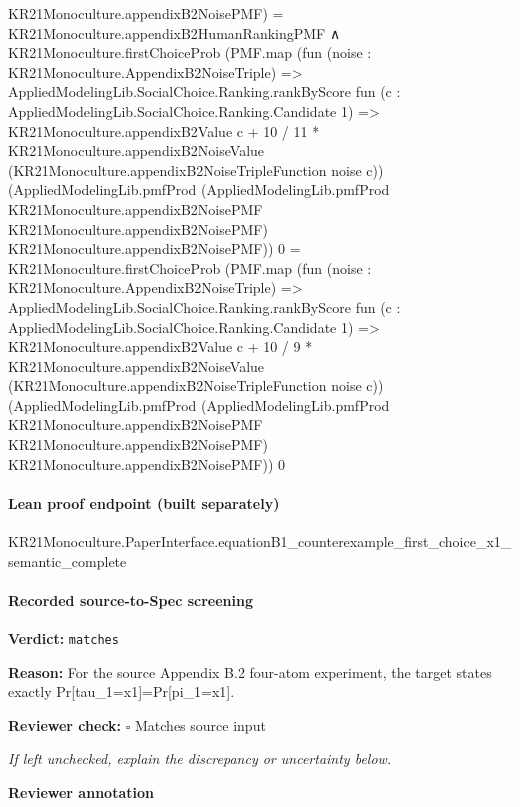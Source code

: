 \documentclass[10pt]{article}
\newcommand{\reviewerbox}{%
  \par\noindent\fbox{\parbox{0.96\linewidth}{\rule{0pt}{0.38in}}}\par
}
\newcommand{\reviewmatch}[1]{%
  \par\noindent\textbf{Reviewer check:} $\square$\; #1\par
  \noindent\emph{If left unchecked, explain the discrepancy or uncertainty below.}\par
}
\begin{document}
\begin{ReviewVerbatim}
                      KR21Monoculture.appendixB2NoisePMF) =
                  KR21Monoculture.appendixB2HumanRankingPMF ∧
                KR21Monoculture.firstChoiceProb
                    (PMF.map
                      (fun (noise : KR21Monoculture.AppendixB2NoiseTriple) =>
                        AppliedModelingLib.SocialChoice.Ranking.rankByScore
                          fun (c : AppliedModelingLib.SocialChoice.Ranking.Candidate 1) =>
                          KR21Monoculture.appendixB2Value c +
                            10 / 11 *
                              KR21Monoculture.appendixB2NoiseValue
                                (KR21Monoculture.appendixB2NoiseTripleFunction noise c))
                      (AppliedModelingLib.pmfProd
                        (AppliedModelingLib.pmfProd KR21Monoculture.appendixB2NoisePMF
                          KR21Monoculture.appendixB2NoisePMF)
                        KR21Monoculture.appendixB2NoisePMF))
                    0 =
                  KR21Monoculture.firstChoiceProb
                    (PMF.map
                      (fun (noise : KR21Monoculture.AppendixB2NoiseTriple) =>
                        AppliedModelingLib.SocialChoice.Ranking.rankByScore
                          fun (c : AppliedModelingLib.SocialChoice.Ranking.Candidate 1) =>
                          KR21Monoculture.appendixB2Value c +
                            10 / 9 *
                              KR21Monoculture.appendixB2NoiseValue
                                (KR21Monoculture.appendixB2NoiseTripleFunction noise c))
                      (AppliedModelingLib.pmfProd
                        (AppliedModelingLib.pmfProd KR21Monoculture.appendixB2NoisePMF
                          KR21Monoculture.appendixB2NoisePMF)
                        KR21Monoculture.appendixB2NoisePMF))
                    0
\end{ReviewVerbatim}

\paragraph{Lean proof endpoint (built separately)}\begin{ReviewVerbatim}
KR21Monoculture.PaperInterface.equationB1_counterexample_first_choice_x1_semantic_complete
\end{ReviewVerbatim}

\paragraph{Recorded source-to-Spec screening}
\textbf{Verdict:} \texttt{matches}
\\
{\raggedright
\textbf{Reason:} For the source Appendix B.\allowbreak{}2 four-\allowbreak{}atom experiment, the target states exactly Pr[tau\_\allowbreak{}1=x1]=Pr[pi\_\allowbreak{}1=x1].\allowbreak{}
\par}
\reviewmatch{Matches source input}
\noindent\textbf{Reviewer annotation}\par
\reviewerbox
\clearpage
\hypertarget{source-claim-a3b878a82854afb8}{}
\end{document}
